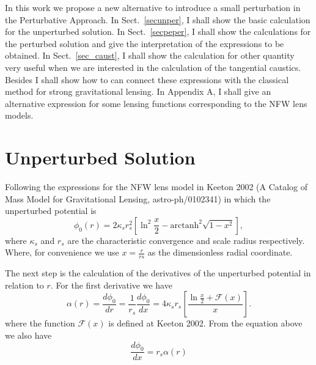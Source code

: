 \documentclass[a4paper,twoside,prd]{revtex4}
\def \ks {\kappa_s}
\def \rs {r_s}
\def \mf {\mathcal{F}}
\def \atanh {\mathrm{arctanh} }
\def \po {\phi_0}
\def \al {\alpha}
\begin{document}
In this work we propose a new alternative to introduce a small perturbation in the Perturbative Approach. In Sect.~\ref{secunper}, I shall show the basic calculation for the unperturbed solution. In Sect.~\ref{secpeper}, I shall show the calculations for the perturbed solution and give the interpretation of the expressions to be obtained. In Sect.~\ref{sec_caust}, I shall show the calculation for other quantity very useful when we are interested in the calculation of the tangential caustics. Besides I shall show how to can connect these expressions with the classical method for strong gravitational lensing. In Appendix A, I shall give an alternative expression for some lensing functions corresponding to the NFW lens models.

\section{\label{secunper}Unperturbed Solution}

Following the expressions for the NFW lens model in Keeton 2002 (A Catalog of Mass Model for Gravitational Lensing, astro-ph/0102341) in which 
the unperturbed potential is
\begin{equation}
\po(r)=2\ks \rs^2\left[\ln^2\dfrac{x}{2}-\atanh^2\sqrt{1-x^2}\right],
\label{nfwpot}
\end{equation}
where $\ks$ and $\rs$ are the characteristic convergence and scale radius respectively. Where, for convenience we use $x=\frac{r}{rs}$ as  the dimensionless radial coordinate.

The next step is the calculation of the derivatives of the unperturbed potential in relation to $r$. For the first 
derivative we have
\begin{equation}
\al(r)=\dfrac{d\po}{dr}=\frac{1}{\rs}\frac{d\po}{dx}=4\ks\rs\left[\dfrac{\ln\frac{x}{2}+\mf(x)}{x}\right].
\label{nfwfd}
\end{equation}
where the function $\mf(x)$ is defined at Keeton 2002. From the equation above we also have
\begin{equation}
\dfrac{d\po}{dx}=\rs\al(r)
\label{rda}
\end{equation}
\end{document}
